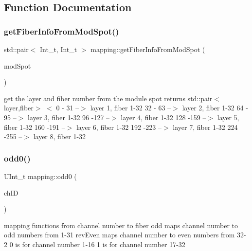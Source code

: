 \subsection{Function Documentation}
\mbox{\label{namespacemapping_aa1474356b6c030e524bce7a388e20cd8}} 
\subsubsection{\texorpdfstring{get\+Fiber\+Info\+From\+Mod\+Spot()}{getFiberInfoFromModSpot()}}
{\footnotesize\ttfamily std\+::pair$<$ Int\+\_\+t, Int\+\_\+t $>$ mapping\+::get\+Fiber\+Info\+From\+Mod\+Spot (\begin{DoxyParamCaption}\item[{Int\+\_\+t}]{mod\+Spot }\end{DoxyParamCaption})}

get the layer and fiber number from the module spot returns std\+::pair$<$layer,fiber$>$ $<$ 0 -\/ 31 --$>$ layer 1, fiber 1-\/32 32 -\/ 63 --$>$ layer 2, fiber 1-\/32 64 -\/ 95 --$>$ layer 3, fiber 1-\/32 96 -\/127 --$>$ layer 4, fiber 1-\/32 128 -\/159 --$>$ layer 5, fiber 1-\/32 160 -\/191 --$>$ layer 6, fiber 1-\/32 192 -\/223 --$>$ layer 7, fiber 1-\/32 224 -\/255 --$>$ layer 8, fiber 1-\/32 \mbox{\label{namespacemapping_a00520b73ed7ad6ada40fe422bf20b4b7}} 
\subsubsection{\texorpdfstring{odd0()}{odd0()}}
{\footnotesize\ttfamily U\+Int\+\_\+t mapping\+::odd0 (\begin{DoxyParamCaption}\item[{U\+Int\+\_\+t}]{ch\+ID }\end{DoxyParamCaption})\hspace{0.3cm}{\ttfamily [inline]}}

mapping functions from channel number to fiber odd maps channel number to odd numbers from 1-\/31 rev\+Even maps channel number to even numbers from 32-\/2 0 is for channel number 1-\/16 1 is for channel number 17-\/32 